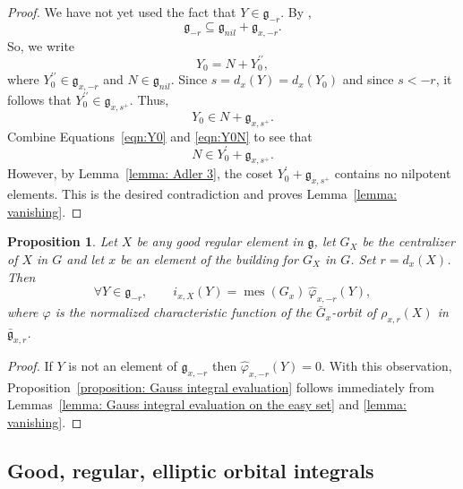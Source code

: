 \documentclass[11pt]{amsart}
\newtheorem{proposition}[theorem]{Proposition}
\theoremstyle{definition}
\theoremstyle{remark}
\numberwithin{equation}{theorem}
\def\GF{{G}}
\def\gF{{\mathfrak{g}}}
\newcommand{\Mf}{{\bar\GF}}
\newcommand{\mf}{{\bar\gF}}
\def\vphi{{\varphi}}
\def\hphi{{\hat{\varphi}}}
\def\i{{i}}
\def\meas{{\operatorname{mes}}}
\def\nilp{{nil}}
\begin{document}
\begin{proof}
We have not yet used the fact that $Y \in \gF_{-r}$. By
\cite[3.1.2,~part~1]{Adler-DeBacker},
\begin{equation}
\gF_{-r} \subseteq \gF_\nilp+\gF_{x,-r}.
\end{equation}
So, we write
\begin{equation}\label{eqn:Y0}
Y_0 =  N + Y_0^{\prime\prime},
\end{equation}
where $Y_0^{\prime\prime} \in \gF_{x,-r}$ and $N \in \gF_{\nilp}$. Since $s
=
d_x(Y) = d_x(Y_0)$ and since $s < -r$, it follows that $Y_0^{\prime\prime}
\in
\gF_{x,s^+}$. Thus,
\begin{equation}\label{eqn:Y0N}
Y_0 \in N + \gF_{x,s^+}.
\end{equation}
Combine Equations~\ref{eqn:Y0} and \ref{eqn:Y0N} to see that
\begin{equation}
N \in Y_0^\prime + \gF_{x,s^+}.
\end{equation}
However, by Lemma~\ref{lemma: Adler 3}, the coset $Y_0^\prime +
\gF_{x,s^+}$ contains no nilpotent elements. This is the desired
contradiction and proves Lemma~\ref{lemma: vanishing}.
\end{proof}

\begin{proposition}\label{proposition: Gauss integral evaluation}
Let $X$ be any good regular element in $\gF$, let $\GF_X$ be the
centralizer of $X$ in $\GF$ and let $x$ be an element of the
building for $\GF_X$ in $\GF$. Set $r=d_x(X)$. Then
\begin{equation}
    \forall  Y\in \gF_{-r},\qquad\i_{x,X}(Y) = \meas(\GF_x)\
\hphi_{x,-r}(Y),
\end{equation}
where $\vphi$ is the normalized characteristic function of the $\Mf_x$-orbit
of
$\rho_{x,r}(X)$ in $\mf_{x,r}$.
\end{proposition}

\begin{proof}
If $Y$ is not an element of $\gF_{x,-r}$ then $\hphi_{x,-r}(Y)
=0$. With this observation, Proposition~\ref{proposition: Gauss
integral evaluation} follows immediately from Lemmas~\ref{lemma:
Gauss integral evaluation on the easy set} and \ref{lemma:
vanishing}.
\end{proof}




\subsection{Good, regular, elliptic orbital integrals}\label{section:
elliptic integrals}
\end{document}
